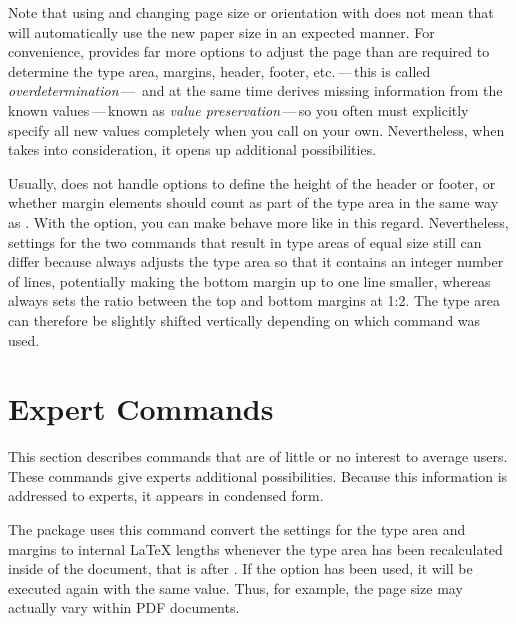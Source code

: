 Note that using  and changing page size or orientation with
 does not mean that  will automatically
use the new paper size in an expected manner. For convenience,
 provides far more options to adjust the page than are
required to determine the type area, margins, header, footer, etc.\,---\,this
is called \emph{overdetermination}\,---\, and at the same time
 derives missing information from the known
values\,---\,known as \emph{value preservation}\,---\,so you often must
explicitly specify all new values completely when you call 
on your own. Nevertheless, when  takes 
into consideration, it opens up additional possibilities.%
\EndIndexGroup


\begin{Declaration}
\end{Declaration}
Usually,  does not handle options to define the
height of the header or footer, or whether margin elements should count as
part of the type area in the same way as . With
the  option, you
can make  behave more like
 in this regard. Nevertheless, settings for the
two commands that result in type areas of equal size still can differ because
 always adjusts the type area so that it
contains an integer number of lines, potentially making the bottom margin up
to one line smaller, whereas  always sets the
ratio between the top and bottom margins at 1:2. The type area can therefore
be slightly shifted vertically depending on which command was used.%
\EndIndexGroup


\section{Expert Commands}

This section describes commands that are of little or no interest to average
users. These commands give experts additional possibilities. Because this
information is addressed to experts, it appears in condensed form.

\begin{Declaration}
\end{Declaration}%
The  package uses this command convert the settings for the
type area and margins to internal \LaTeX{} lengths whenever the type area has
been recalculated inside of the document, that is after
. If the 
option has been used, it will be executed again with the same value. Thus, for
example, the page size may actually vary within PDF documents.

